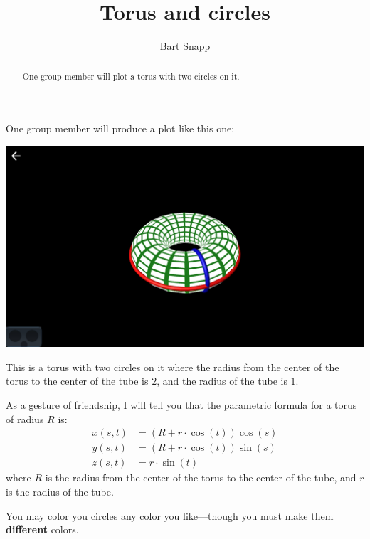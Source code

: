 \documentclass{ximera}
\author{Bart Snapp}
\title{Torus and circles}
\begin{document}
\begin{abstract}
  One group member will plot a torus with two circles on it.
\end{abstract}
\maketitle

One group member will produce a plot like this one:
\begin{image}
  \includegraphics{torusAndCircles.png}
\end{image}

This is a torus with two circles on it where the radius from the
center of the torus to the center of the tube is $2$, and the radius
of the tube is $1$.


As a gesture of friendship, I will tell you that the parametric
formula for a torus of radius $R$ is:
\begin{align*}
  x(s,t) &= (R + r\cdot \cos(t))\cos(s)\\
  y(s,t) &= (R + r\cdot \cos(t))\sin(s)\\
  z(s,t) &= r\cdot \sin(t)
\end{align*}
where $R$ is the radius from the center of the torus to the center
of the tube, and $r$ is the radius of the tube.

  
You may color you circles any color you like---though you must make
them \textbf{different} colors.
\end{document}
